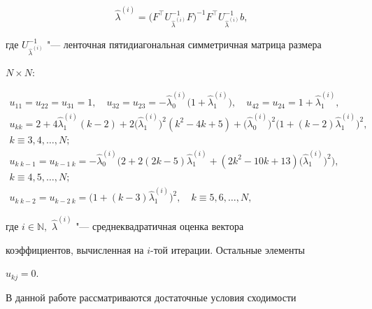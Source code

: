 \begin{equation}

    \label{math/2}

    \hat{\lambda}^{( i ) }= \bigl( F^{\top}U^{-1}_{\hat{\lambda}^{( i ) }}F \bigr) ^{-1}F^{\top}U^{-1}_{\hat{\lambda}^{( i ) }}b, 

\end{equation}

где $U^{-1}_{\hat{\lambda}^{( i ) }}$ "--- ленточная пятидиагональная  симметричная матрица размера

$N{\times} N$:

\begin{gather*}

u_{11}=u_{22}=u_{31}=1, \quad 

u_{32}=u_{23}=-\hat{\lambda}^{( i ) }_0 \bigl( 1+\hat{\lambda}^{( i ) }_1 \bigr) , \quad

u_{42}=u_{24}=1+\hat{\lambda}^{( i ) }_1, \\

u_{k k}=

    2+4\hat{\lambda}^{( i ) }_1( k-2 ) +2 \bigl( \hat{\lambda}^{( i ) }_1 \bigr) ^2( k^2-4k+5 ) + \bigl( \hat{\lambda}^{( i ) }_0 \bigr) ^2 \bigl( 1+( k-2 ) \hat{\lambda}^{( i ) }_1 \bigr) ^2, \\

k\equiv 3, 4, \ldots, N;\\

u_{k~k-1}=u_{k-1~k}=

    -\hat{\lambda}^{( i ) }_0 \bigl( 2+2( 2k-5 ) \hat{\lambda}^{( i ) }_1+( 2k^2-10k+13 ) \bigl( \hat{\lambda}^{( i ) }_1 \bigr) ^2 \bigr) ,\\ k\equiv 4,  5,  \ldots,  N;

\\

u_{k~k-2}=u_{k-2~k}= \bigl( 1+( k-3 ) \hat{\lambda}^{( i ) }_1 \bigr) ^2, \quad

 k\equiv 5, 6, \ldots, N, 

\end{gather*}

 где $i\in \mathbb N,$ $\hat{\lambda}^{( i ) }$ "--- среднеквадратичная оценка вектора

коэффициентов,  вычисленная на $i$-той итерации. Остальные элементы

$u_{kj}=0$.




В данной работе рассматриваются достаточные условия сходимости

